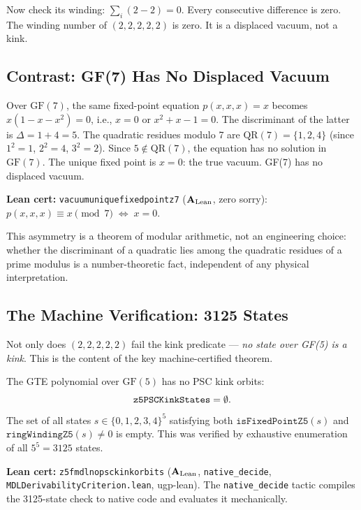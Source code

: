 \documentclass[11pt,openany]{book}
\theoremstyle{remark}
\newcommand{\lean}[1]{%
  \penalty-100
  \begingroup\def\_{\textunderscore\allowbreak}\texttt{#1}\endgroup}
\newcommand{\CatAL}{\ensuremath{\textbf{A}_{\rm Lean}}}
\begin{document}
Now check its winding: $\sum_i (2-2) = 0$. Every consecutive difference is zero.
The winding number of $(2,2,2,2,2)$ is zero. It is a displaced vacuum, not a kink.

\subsection*{Contrast: GF(7) Has No Displaced Vacuum}

Over $\mathrm{GF}(7)$, the same fixed-point equation $p(x,x,x) = x$ becomes
$x(1-x-x^2) = 0$, i.e., $x = 0$ or $x^2+x-1=0$. The discriminant of the latter
is $\Delta = 1+4 = 5$. The quadratic residues modulo 7 are
$\mathrm{QR}(7) = \{1,2,4\}$ (since $1^2=1$, $2^2=4$, $3^2=2$). Since
$5 \notin \mathrm{QR}(7)$, the equation has no solution in $\mathrm{GF}(7)$. The
unique fixed point is $x = 0$: the true vacuum. GF(7) has no displaced vacuum.

\textbf{Lean cert:} \lean{vacuum\_unique\_fixed\_point\_z7} (\CatAL, zero sorry):
$p(x,x,x) \equiv x \pmod 7 \;\Leftrightarrow\; x = 0$.

This asymmetry is a theorem of modular arithmetic, not an engineering choice: whether
the discriminant of a quadratic lies among the quadratic residues of a prime modulus
is a number-theoretic fact, independent of any physical interpretation.

\subsection*{The Machine Verification: 3125 States}

Not only does $(2,2,2,2,2)$ fail the kink predicate --- \emph{no state over GF(5) is a kink}.
This is the content of the key machine-certified theorem.

\begin{tcolorbox}[colback=orange!5,colframe=orange!60,
  title={Result: GF(5) Has Zero Topological Kink Orbits (\CatAL, \texttt{native\_decide})}]
The GTE polynomial over $\mathrm{GF}(5)$ has no PSC kink orbits:
\[
\lean{z5PSCKinkStates} = \emptyset.
\]
The set of all states $s \in \{0,1,2,3,4\}^5$ satisfying both $\mathtt{isFixedPointZ5}(s)$
and $\mathtt{ringWindingZ5}(s) \neq 0$ is empty. This was verified by exhaustive enumeration
of all $5^5 = 3125$ states.

\smallskip\noindent
\textbf{Lean cert:} \lean{z5\_fmdl\_no\_psc\_kink\_orbits} (\CatAL, \texttt{native\_decide},
\texttt{MDLDerivabilityCriterion.lean}, ugp-lean). The \texttt{native\_decide} tactic
compiles the 3125-state check to native code and evaluates it mechanically.
\end{tcolorbox}
\end{document}
